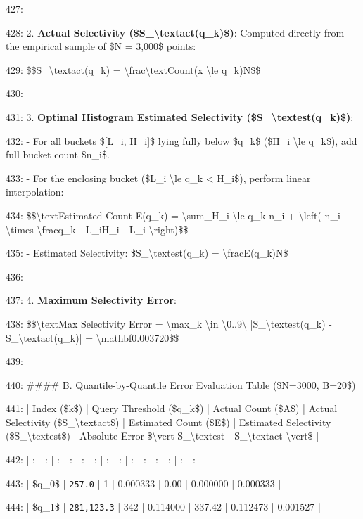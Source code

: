 \documentclass[11pt,a4paper]{article}
\begin{document}
427:

428: 2. \textbf{Actual Selectivity (\$S\_{\textbackslash{}text{act}}(q\_k)\$)}: Computed directly from the empirical sample of \$N = 3,000\$ points:

429:    \$\$S\_{\textbackslash{}text{act}}(q\_k) = \textbackslash{}frac{\textbackslash{}text{Count}(x \textbackslash{}le q\_k)}{N}\$\$

430:

431: 3. \textbf{Optimal Histogram Estimated Selectivity (\$S\_{\textbackslash{}text{est}}(q\_k)\$)}:

432:    - For all buckets \$[L\_i, H\_i]\$ lying fully below \$q\_k\$ (\$H\_i \textbackslash{}le q\_k\$), add full bucket count \$n\_i\$.

433:    - For the enclosing bucket (\$L\_i \textbackslash{}le q\_k < H\_i\$), perform linear interpolation:

434:      \$\$\textbackslash{}text{Estimated Count } E(q\_k) = \textbackslash{}sum\_{H\_i \textbackslash{}le q\_k} n\_i + \textbackslash{}left( n\_i \textbackslash{}times \textbackslash{}frac{q\_k - L\_i}{H\_i - L\_i} \textbackslash{}right)\$\$

435:    - Estimated Selectivity: \$S\_{\textbackslash{}text{est}}(q\_k) = \textbackslash{}frac{E(q\_k)}{N}\$

436:

437: 4. \textbf{Maximum Selectivity Error}:

438:    \$\$\textbackslash{}text{Max Selectivity Error} = \textbackslash{}max\_{k \textbackslash{}in \textbackslash{}{0..9\textbackslash{}}} |S\_{\textbackslash{}text{est}}(q\_k) - S\_{\textbackslash{}text{act}}(q\_k)| = \textbackslash{}mathbf{0.003720}\$\$

439:

440: \#\#\#\# B. Quantile-by-Quantile Error Evaluation Table (\$N=3000, B=20\$)

441: | Index (\$k\$) | Query Threshold (\$q\_k\$) | Actual Count (\$A\$) | Actual Selectivity (\$S\_{\textbackslash{}text{act}}\$) | Estimated Count (\$E\$) | Estimated Selectivity (\$S\_{\textbackslash{}text{est}}\$) | Absolute Error \$\textbackslash{}vert S\_{\textbackslash{}text{est}} - S\_{\textbackslash{}text{act}} \textbackslash{}vert\$ |

442: | :---: | :---: | :---: | :---: | :---: | :---: | :---: |

443: | \$q\_0\$ | \texttt{257.0} | 1 | 0.000333 | 0.00 | 0.000000 | 0.000333 |

444: | \$q\_1\$ | \texttt{281,123.3} | 342 | 0.114000 | 337.42 | 0.112473 | 0.001527 |
\end{document}
